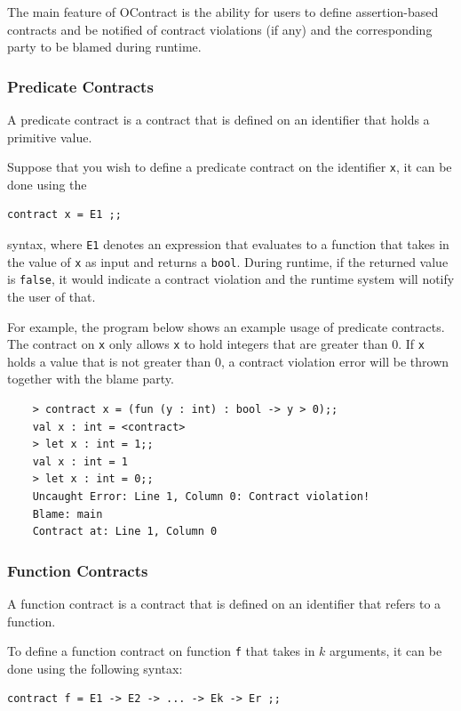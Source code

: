 \documentclass[a4paper]{article}
\begin{document}
The main feature of OContract is the ability for users to define assertion-based contracts and be notified of contract violations (if any) and the corresponding party to be blamed during runtime.

\subsubsection{Predicate Contracts}

A predicate contract is a contract that is defined on an identifier that holds a primitive value.

Suppose that you wish to define a predicate contract on the identifier \texttt{x}, it can be done using the

\begin{verbatim}
contract x = E1 ;;
\end{verbatim}

syntax, where \texttt{E1} denotes an expression that evaluates to a function that takes in the value of \texttt{x} as input and returns a \texttt{bool}.
During runtime, if the returned value is \texttt{false}, it would indicate a contract violation and the runtime system will notify the user of that.

For example, the program below shows an example usage of predicate contracts. The contract on \texttt{x} only allows \texttt{x} to hold integers that are greater than 0.
If \texttt{x} holds a value that is not greater than 0, a contract violation error will be thrown together with the blame party.

\begin{verbatim}
    > contract x = (fun (y : int) : bool -> y > 0);;
    val x : int = <contract>
    > let x : int = 1;;
    val x : int = 1
    > let x : int = 0;;
    Uncaught Error: Line 1, Column 0: Contract violation!
    Blame: main
    Contract at: Line 1, Column 0
\end{verbatim}

\subsubsection{Function Contracts}

A function contract is a contract that is defined on an identifier that refers to a function.

To define a function contract on function \texttt{f} that takes in $k$ arguments, it can be done using the following syntax:

\begin{verbatim}
contract f = E1 -> E2 -> ... -> Ek -> Er ;;
\end{verbatim}
\end{document}
